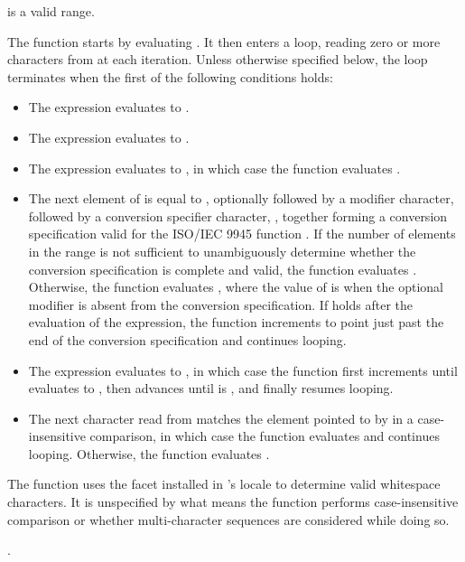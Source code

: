 \begin{itemdescr}
\pnum
\expects
{} is a valid range.

\pnum
\effects
The function starts by evaluating .
It then enters a loop,
reading zero or more characters from  at each iteration.
Unless otherwise specified below,
the loop terminates when the first of the following conditions holds:
\begin{itemize}
\item
The expression  evaluates to .
\item
The expression  evaluates to .
\item
The expression  evaluates to ,
in which case
the function evaluates .
\item
The next element of  is equal to ,
optionally followed by a modifier character,
followed by a conversion specifier character, ,
together forming a conversion specification
valid for the ISO/IEC 9945 function .
If the number of elements in the range 
is not sufficient to unambiguously determine
whether the conversion specification is complete and valid,
the function evaluates .
Otherwise,
the function evaluates ,
where the value of  is 
when the optional modifier is absent from the conversion specification.
If  holds
after the evaluation of the expression,
the function increments 
to point just past the end of the conversion specification and
continues looping.

\item
The expression  evaluates to ,
in which case the function first increments  until
 evaluates to ,
then advances 
until  is , and
finally resumes looping.

\item
The next character read from 
matches the element pointed to by  in a case-insensitive comparison,
in which case the function evaluates  and continues looping.
Otherwise, the function evaluates .
\end{itemize}

\pnum
\begin{note}
The function uses the  facet
installed in 's locale
to determine valid whitespace characters.
It is unspecified
by what means the function performs case-insensitive comparison or
whether multi-character sequences are considered while doing so.
\end{note}

\pnum
\returns
{}.
\end{itemdescr}

